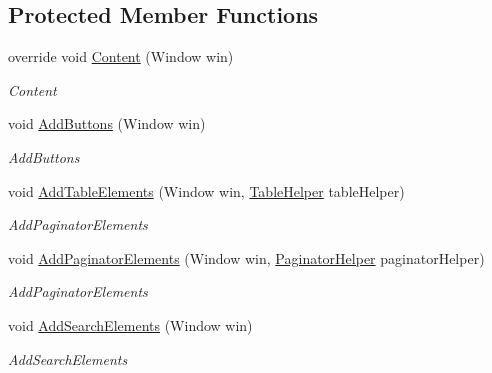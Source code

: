 \subsection*{Protected Member Functions}
\begin{DoxyCompactItemize}
\item 
override void \mbox{\hyperlink{class_gtd_app_1_1_console_1_1_views_1_1_containers_1_1_list_containers_view_a27f8e950a87748409e4911046309a299}{Content}} (Window win)
\begin{DoxyCompactList}\small\item\em Content \end{DoxyCompactList}\item 
void \mbox{\hyperlink{class_gtd_app_1_1_console_1_1_views_1_1_containers_1_1_list_containers_view_a5e55e9c80a1e759ea9588a0ee6150a36}{Add\+Buttons}} (Window win)
\begin{DoxyCompactList}\small\item\em Add\+Buttons \end{DoxyCompactList}\item 
void \mbox{\hyperlink{class_gtd_app_1_1_console_1_1_views_1_1_containers_1_1_list_containers_view_a2b7665ebd4d3b41c139ce5c7d3cd99e8}{Add\+Table\+Elements}} (Window win, \mbox{\hyperlink{class_gtd_app_1_1_console_core_1_1_views_1_1_helpers_1_1_table_helper}{Table\+Helper}} table\+Helper)
\begin{DoxyCompactList}\small\item\em Add\+Paginator\+Elements \end{DoxyCompactList}\item 
void \mbox{\hyperlink{class_gtd_app_1_1_console_1_1_views_1_1_containers_1_1_list_containers_view_a84ee4350167b66dfcae5f341dddd29d7}{Add\+Paginator\+Elements}} (Window win, \mbox{\hyperlink{class_gtd_app_1_1_console_core_1_1_views_1_1_helpers_1_1_paginator_helper}{Paginator\+Helper}} paginator\+Helper)
\begin{DoxyCompactList}\small\item\em Add\+Paginator\+Elements \end{DoxyCompactList}\item 
void \mbox{\hyperlink{class_gtd_app_1_1_console_1_1_views_1_1_containers_1_1_list_containers_view_a395f25495a3b891d568a95680055536c}{Add\+Search\+Elements}} (Window win)
\begin{DoxyCompactList}\small\item\em Add\+Search\+Elements \end{DoxyCompactList}\item 

\end{DoxyCompactItemize}
